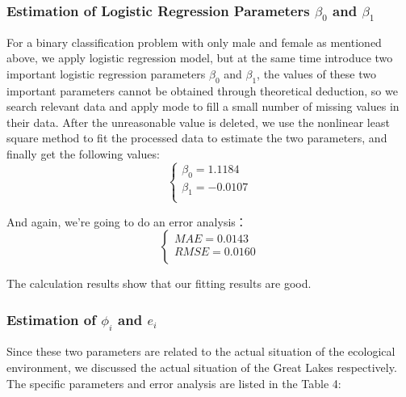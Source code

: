 \documentclass[12pt]{article}  %
\begin{document}
\subsubsection{Estimation of Logistic Regression Parameters $\beta_{0}$ and $\beta_{1}$}
For a binary classification problem with only male and female as mentioned above, we apply logistic regression model, but at the same time introduce two important logistic regression parameters $\beta_{0}$ and $\beta_{1}$, the values of these two important parameters cannot be obtained through theoretical deduction, so we search relevant data and apply mode to fill a small number of missing values in their data. After the unreasonable value is deleted, we use the nonlinear least square method to fit the processed data to estimate the two parameters, and finally get the following values:
\begin{equation}
	\begin{cases}
		\beta _0=1.1184\\
		\beta _1=-0.0107\\
	\end{cases}
\end{equation}

And again, we're going to do an error analysis：
\begin{equation}
	\begin{cases}
		MAE=0.0143\\
		RMSE=0.0160\\
	\end{cases}
\end{equation}

The calculation results show that our fitting results are good.
\subsubsection{Estimation of $\phi_{i}$ and $e_{i}$}

Since these two parameters are related to the actual situation of the ecological environment, we discussed the actual situation of the Great Lakes respectively. The specific parameters and error analysis are listed in the  Table 4:
\end{document}
